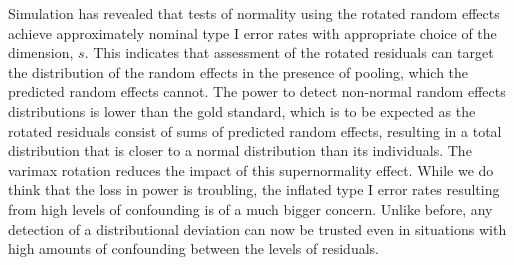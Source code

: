 \documentclass[12pt]{article} %
\begin{document}

Simulation has revealed that tests of normality using the rotated random effects achieve approximately nominal type I error rates with appropriate choice of the dimension, $s$. This indicates that assessment of the rotated residuals can target the distribution of the random effects in the presence of pooling, which the predicted random effects cannot. The power to detect non-normal random effects distributions is lower than the gold standard, which is to be expected as the rotated residuals consist of sums of predicted random effects, resulting in a total distribution that is closer to a normal distribution than its individuals.  %
The varimax rotation reduces the impact of this supernormality effect. %
While we do think that the loss in power is troubling,
 the inflated type I error rates resulting from high levels of confounding is of a much bigger concern. Unlike before,  any detection of a distributional deviation can now be trusted even in situations with high amounts of  confounding between the levels of residuals.
  
 

\end{document}
